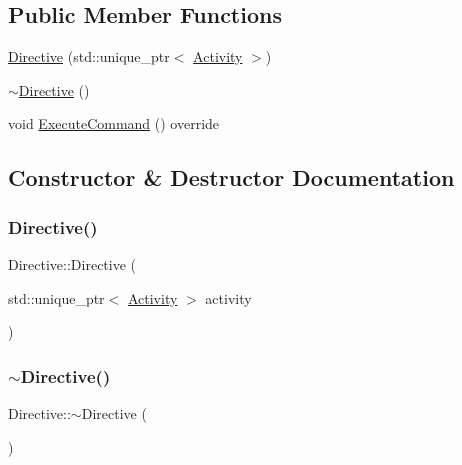 \subsection*{Public Member Functions}
\begin{DoxyCompactItemize}
\item 
\mbox{\hyperlink{class_directive_a6c5ba515b309dd0879b7ca52426845f2}{Directive}} (std\+::unique\+\_\+ptr$<$ \mbox{\hyperlink{class_activity}{Activity}} $>$)
\item 
\mbox{\hyperlink{class_directive_ab773b1f0c0aa0869cbbebe1a6e524c3e}{$\sim$\+Directive}} ()
\item 
void \mbox{\hyperlink{class_directive_a4297adea8d9504bb3b863829cea1b286}{Execute\+Command}} () override
\end{DoxyCompactItemize}


\subsection{Constructor \& Destructor Documentation}
\mbox{\label{class_directive_a6c5ba515b309dd0879b7ca52426845f2}} 
\subsubsection{\texorpdfstring{Directive()}{Directive()}}
{\footnotesize\ttfamily Directive\+::\+Directive (\begin{DoxyParamCaption}\item[{std\+::unique\+\_\+ptr$<$ \mbox{\hyperlink{class_activity}{Activity}} $>$}]{activity }\end{DoxyParamCaption})\hspace{0.3cm}{\ttfamily [explicit]}}

\mbox{\label{class_directive_ab773b1f0c0aa0869cbbebe1a6e524c3e}} 
\subsubsection{\texorpdfstring{$\sim$Directive()}{~Directive()}}
{\footnotesize\ttfamily Directive\+::$\sim$\+Directive (\begin{DoxyParamCaption}{ }\end{DoxyParamCaption})}



